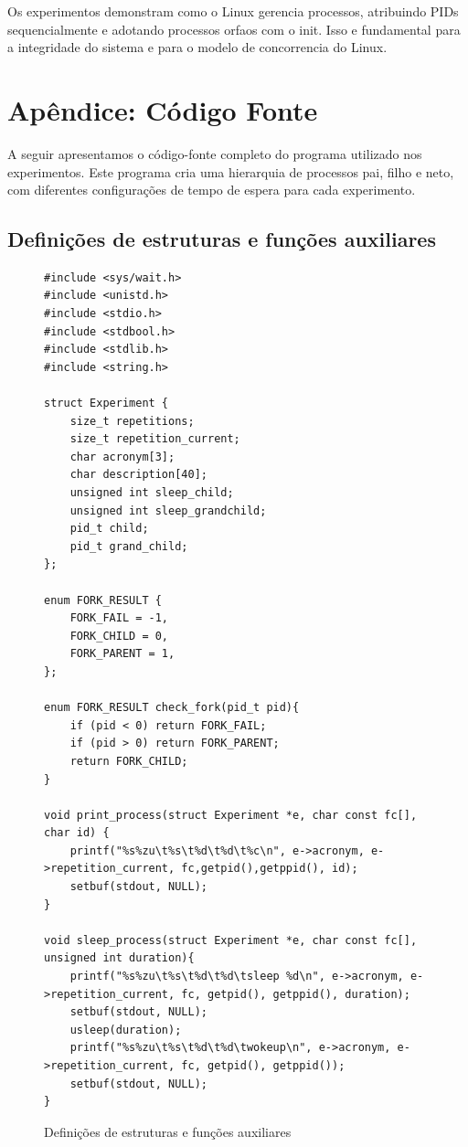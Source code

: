 \documentclass[12pt]{article}
\begin{document}
Os experimentos demonstram como o Linux gerencia processos, atribuindo PIDs sequencialmente e adotando processos orfaos com o init. Isso e fundamental para a integridade do sistema e para o modelo de concorrencia do Linux.

\section{Apêndice: Código Fonte}

A seguir apresentamos o código-fonte completo do programa utilizado nos experimentos. Este programa cria uma hierarquia de processos pai, filho e neto, com diferentes configurações de tempo de espera para cada experimento.

\subsection{Definições de estruturas e funções auxiliares}

\begin{figure}[ht]
\begin{verbatim}
#include <sys/wait.h>
#include <unistd.h>
#include <stdio.h>
#include <stdbool.h>
#include <stdlib.h>
#include <string.h>

struct Experiment {
    size_t repetitions;
    size_t repetition_current;
    char acronym[3];
    char description[40];
    unsigned int sleep_child;
    unsigned int sleep_grandchild;
    pid_t child;
    pid_t grand_child;
};

enum FORK_RESULT {
    FORK_FAIL = -1,
    FORK_CHILD = 0,
    FORK_PARENT = 1,
};

enum FORK_RESULT check_fork(pid_t pid){
    if (pid < 0) return FORK_FAIL;
    if (pid > 0) return FORK_PARENT;
    return FORK_CHILD;
}

void print_process(struct Experiment *e, char const fc[], char id) {
    printf("%s%zu\t%s\t%d\t%d\t%c\n", e->acronym, e->repetition_current, fc,getpid(),getppid(), id);
    setbuf(stdout, NULL);
}

void sleep_process(struct Experiment *e, char const fc[], unsigned int duration){
    printf("%s%zu\t%s\t%d\t%d\tsleep %d\n", e->acronym, e->repetition_current, fc, getpid(), getppid(), duration);
    setbuf(stdout, NULL);
    usleep(duration);
    printf("%s%zu\t%s\t%d\t%d\twokeup\n", e->acronym, e->repetition_current, fc, getpid(), getppid());
    setbuf(stdout, NULL);
}
\end{verbatim}
\caption{Definições de estruturas e funções auxiliares}
\label{fig:code1}
\end{figure}
\end{document}
